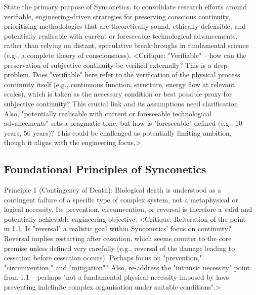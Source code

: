 \documentclass[10pt]{article}
\begin{document}
\begin{sloppypar}
  State the primary purpose of Synconetics: to consolidate research efforts around verifiable, engineering-driven strategies for preserving conscious continuity, prioritising methodologies that are theoretically sound, ethically defensible, and potentially realisable with current or foreseeable technological advancements, rather than relying on distant, speculative breakthroughs in fundamental science (e.g., a complete theory of consciousness). <Critique: "Verifiable" – how can the preservation of subjective continuity be verified externally? This is a deep problem. Does "verifiable" here refer to the verification of the physical process continuity itself (e.g., continuous function, structure, energy flow at relevant scales), which is taken as the necessary condition or best possible proxy for subjective continuity? This crucial link and its assumptions need clarification. Also, "potentially realisable with current or foreseeable technological advancements" sets a pragmatic tone, but how is "foreseeable" defined (e.g., 10 years, 50 years)? This could be challenged as potentially limiting ambition, though it aligns with the engineering focus.>

  \subsection{Foundational Principles of Synconetics}
  \label{sec:foundational-principles}

  Principle 1 (Contingency of Death): Biological death is understood as a contingent failure of a specific type of complex system, not a metaphysical or logical necessity. Its prevention, circumvention, or reversal is therefore a valid and potentially achievable engineering objective. <Critique: Reiteration of the point in 1.1. Is "reversal" a realistic goal within Synconetics' focus on continuity? Reversal implies restarting after cessation, which seems counter to the core premise unless defined very carefully (e.g., reversal of the damage leading to cessation before cessation occurs). Perhaps focus on "prevention," "circumvention," and "mitigation"? Also, re-address the "intrinsic necessity" point from 1.1 – perhaps "not a fundamental physical necessity imposed by laws preventing indefinite complex organisation under suitable conditions".>


\end{sloppypar}
\end{document}
